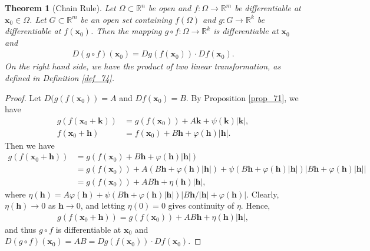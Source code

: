 \documentclass[10pt]{book}
\newtheorem{theorem}{Theorem}[chapter]
\theoremstyle{definition}
\numberwithin{equation}{chapter}
\begin{document}
\medskip

\begin{theorem}[Chain Rule]\label{th_74}
Let $\Omega \subset \mathbb{R}^n$ be open and $f: \Omega \to \mathbb{R}^m$ be differentiable at $\mathbf{x}_0 \in \Omega$. Let $G \subset \mathbb{R}^m$ be an open set containing $f(\Omega)$ and $g: G \to \mathbb{R}^k$ be differentiable at $f(\mathbf{x}_0)$. Then the mapping $g \circ f: \Omega \to \mathbb{R}^k$ is differentiable at $\mathbf{x}_0$ and
\begin{align*}
    D(g \circ f)(\mathbf{x}_0) = Dg(f(\mathbf{x}_0)) \cdot Df(\mathbf{x}_0).
\end{align*}
On the right hand side, we have the product of two linear transformation, as defined in Definition \ref{def_74}.
\end{theorem}
\begin{proof}
Let $D(g(f(\mathbf{x}_0)) = A$ and $Df(\mathbf{x}_0) = B$. By Proposition \ref{prop_71}, we have
\begin{align*}
    g(f(\mathbf{x}_0 + \mathbf{k})) & = g(f(\mathbf{x}_0)) + A \mathbf{k} + \psi(\mathbf{k}) \left|\mathbf{k}\right|, \\
    f(\mathbf{x}_0 + \mathbf{h}) & = f(\mathbf{x}_0) + B \mathbf{h} + \varphi(\mathbf{h}) \left|\mathbf{h}\right|.
\end{align*}
Then we have
\begin{align*}
    g(f(\mathbf{x}_0 + \mathbf{h})) & = g(f(\mathbf{x}_0) + B \mathbf{h} + \varphi(\mathbf{h}) \left|\mathbf{h}\right|) \\
    & = g(f(\mathbf{x}_0)) + A(B \mathbf{h} + \varphi(\mathbf{h}) \left|\mathbf{h}\right|) + \psi(B \mathbf{h} + \varphi(\mathbf{h}) \left|\mathbf{h}\right|) \left|B \mathbf{h} + \varphi(\mathbf{h}) \left|\mathbf{h}\right|\right| \\
    & = g(f(\mathbf{x}_0)) + AB \mathbf{h} + \eta(\mathbf{h}) \left|\mathbf{h}\right|,
\end{align*}
where $\eta(\mathbf{h}) = A \varphi(\mathbf{h}) + \psi(B \mathbf{h} + \varphi(\mathbf{h}) \left|\mathbf{h}\right|) \left|B \mathbf{h}/\left|\mathbf{h}\right| + \varphi(\mathbf{h})\right|$. Clearly, $\eta(\mathbf{h}) \to 0$ as $\mathbf{h} \to 0$, and letting $\eta(0) = 0$ gives continuity of $\eta$. Hence,
\begin{align*}
    g(f(\mathbf{x}_0 + \mathbf{h})) = g(f(\mathbf{x}_0)) + AB \mathbf{h} + \eta(\mathbf{h}) \left|\mathbf{h}\right|,
\end{align*}
and thus $g \circ f$ is differentiable at $\mathbf{x}_0$ and $D(g \circ f)(\mathbf{x}_0) = AB = Dg(f(\mathbf{x}_0)) \cdot Df(\mathbf{x}_0)$.
\end{proof}
\end{document}
